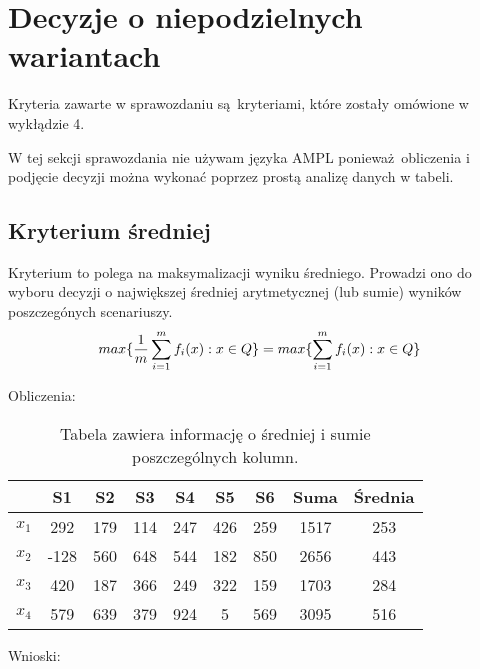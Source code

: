 \documentclass{article}
\begin{document}
\section{Decyzje o niepodzielnych wariantach}

Kryteria zawarte w sprawozdaniu są kryteriami, które zostały omówione w wykłądzie 4.

W tej sekcji sprawozdania nie używam języka AMPL ponieważ obliczenia i podjęcie decyzji można wykonać poprzez
prostą analizę danych w tabeli.

\subsection{Kryterium średniej}


Kryterium to polega na maksymalizacji wyniku średniego. Prowadzi ono do wyboru decyzji o największej średniej arytmetycznej (lub sumie) 
wyników poszczegónych scenariuszy. \\

\begin{equation}
    \centering
    max\{\frac{1}{m} \sum^{m}_{i=1} f_{i}(x) : x \in Q\} = max \{ \sum^{m}_{i=1} f_{i}(x) : x \in Q \}
\end{equation}

Obliczenia:

\begin{table}[H]
  \begin{center}
    \begin{tabular}{ c |  c  c   c   c   c   c  | c | c  }
      & S1 & S2 & S3 & S4 & S5 & S6 & Suma & Średnia \\
      \hline
      $x_1$ & 292 & 179 & 114 & 247 & 426 & 259 & 1517 & 253 \\
      $x_2$ & -128 & 560 & 648 & 544 & 182 & 850 & 2656 & 443 \\
      $x_3$ & 420 & 187 & 366 & 249 & 322 & 159 & 1703 & 284 \\
      $x_4$ & 579 & 639 & 379 & 924 & 5 & 569 & \cellcolor{orange!25} 3095 & \cellcolor{orange!25} 516 \\
      \hline
    \end{tabular} 
    \caption{\label{table:avg}Tabela zawiera informację o średniej i sumie poszczególnych kolumn.}
  \end{center}
\end{table}

Wnioski:
\end{document}
